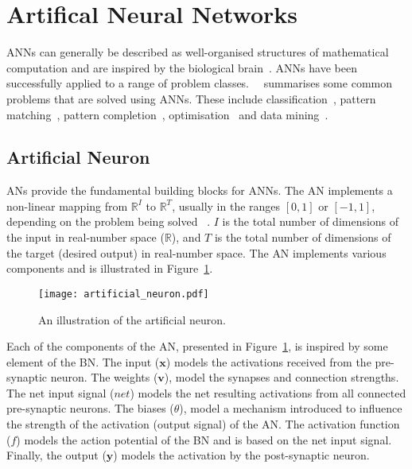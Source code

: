 \section{Artifical Neural Networks}
\label{sec:anns}

\acp{ANN} can generally be described as well-organised structures of mathematical computation and are inspired by the biological brain~\cite{ref:engelbrecht:2007}. \acp{ANN} have been successfully applied to a range of problem classes.~\citeauthor{ref:engelbrecht:2007}~\cite{ref:engelbrecht:2007} summarises some common problems that are solved using \acp{ANN}. These include classification~\cite{ref:khan:2001}, pattern matching~\cite{ref:cannady:1998, ref:kumar:1994}, pattern completion~\cite{ref:dayhoff:2001}, optimisation~\cite{ref:specht:1991} and data mining~\cite{ref:singh:2009}.

\subsection{Artificial Neuron}
\label{sec:anns:an}

\Acp{AN} provide the fundamental building blocks for \acp{ANN}. The \acs{AN} implements a non-linear mapping from $\mathbb{R}^{I}$ to $\mathbb{R}^{T}$, usually in the ranges $[0,1]$ or $[-1,1]$, depending on the problem being solved ~\cite{ref:engelbrecht:2007}. $I$ is the total number of dimensions of the input in real-number space ($\mathbb{R}$), and $T$ is the total number of dimensions of the target (desired output) in real-number space. The \acs{AN} implements various components and is illustrated in Figure~\ref{fig:artificial_neuron}.

\begin{figure}[htb]
	\centering
	\texttt{[image: artificial\_neuron.pdf]}
	\caption[The artificial neuron]{An illustration of the artificial neuron.}
	\label{fig:artificial_neuron}
\end{figure}

Each of the components of the \acs{AN}, presented in Figure~\ref{fig:artificial_neuron}, is inspired by some element of the \acs{BN}. The input ($\boldsymbol{x}$) models the activations received from the pre-synaptic neuron. The weights ($\boldsymbol{v}$), model the synapses and connection strengths. The net input signal ($net$) models the net resulting activations from all connected pre-synaptic neurons. The biases ($\theta$), model a mechanism introduced to influence the strength of the activation (output signal) of the \acs{AN}. The activation function ($f$) models the action potential of the \acs{BN} and is based on the net input signal. Finally, the output ($\boldsymbol{y}$) models the activation by the post-synaptic neuron.

